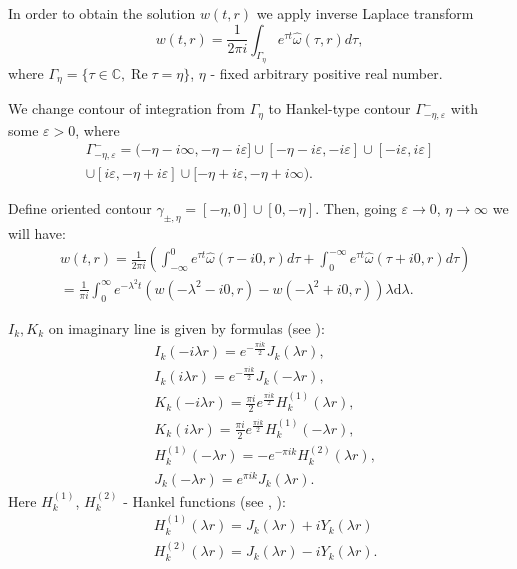 \documentclass[manuscript, printscheme]{paper}
\newcommand{\CM}{\mathbb{C}}
\begin{document}
In order to obtain the solution $w(t,r)$ we apply inverse Laplace transform
$$
w(t,r) = \frac1{2\pi i} \int_{\Gamma_\eta}e^{\tau t}\hat \omega(\tau,r) d\tau,
$$
where $\Gamma_\eta = \{ \tau \in \CM, \operatorname{Re}\tau = \eta \}$, $\eta$ - fixed arbitrary positive real number.

We change contour of integration from $\Gamma_\eta$ to Hankel-type contour $\Gamma_{-\eta, \varepsilon}^-$ with some $\varepsilon>0$, where
\begin{eqnarray}
\Gamma_{-\eta, \varepsilon}^- = ( -\eta -i\infty, -\eta -i\varepsilon] \cup
[-\eta - i\varepsilon, - i\varepsilon]     
\cup [- i\varepsilon, i\varepsilon] \nonumber \\
\cup [i\varepsilon, -\eta + i\varepsilon] 
\cup [-\eta + i\varepsilon, -\eta + i\infty). \nonumber
\end{eqnarray}

Define oriented contour $\gamma_{\pm,\eta} = [-\eta,0] \cup [0,-\eta]$. Then, going $\varepsilon \to 0$, $\eta \to \infty$ we will have:
\begin{align} \label{wkk:wksol}
&w(t,r) =  
\frac1{2\pi i} \left ( \int_{-\infty}^0 e^{\tau t}\hat \omega(\tau-i0,r)d\tau 
+ \int_0^{-\infty} e^{\tau t}\hat \omega(\tau+i0,r)d\tau \right )\\
&=
\frac1{\pi i}  \int_0^\infty e^{-\lambda^2 t} \left ( w(-\lambda^2-i0,r)  - w(-\lambda^2+i0,r) \right )
 \lambda \mathrm{d}\lambda  \nonumber.
\end{align} 

$I_k,K_k$ on imaginary line is given by formulas (see \cite{W}): 
\begin{align} \label{wkk:bescont1}
&I_k(-i\lambda r)=e^{-\frac {\pi i k}2} J_k(\lambda r),  \\  
&I_k(i\lambda r)=e^{-\frac {\pi i k}2}  J_k(-\lambda r),  \\ 
&K_k(-i\lambda r) = \frac{\pi i}2 e^{\frac {\pi i k}2} H_k^{(1)}(\lambda r),  \\ 
&K_k(i\lambda r) =\frac{\pi i}2 e^{\frac {\pi i k}2} H_{k}^{(1)}(-\lambda r),\\
&H_{k}^{(1)}(-\lambda r)=-e^{-\pi i k}H_{k}^{(2)}(\lambda r),\\
&J_{k}(-\lambda r)=e^{\pi i k} J_{k}(\lambda r).\label{wkk:bescont2}
\end{align}
Here $H_k^{(1)}$, $H_{k}^{(2)}$  - Hankel functions (see \cite{BE}, \cite{W}):
\begin{align*} 
&H_k^{(1)}(\lambda r) = J_k(\lambda r) + iY_k(\lambda r) \\
&H_{k}^{(2)}(\lambda r) =
J_{k}(\lambda r) - iY_{k}(\lambda r).
\end{align*}
\end{document}
